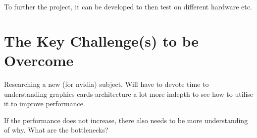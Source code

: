 To further the project, it can be developed to then test on different hardware etc.

\section{The Key Challenge(s) to be Overcome}
Researching a new (for nvidia) subject. Will have to devote time to understanding graphics cards architecture a lot more indepth to see how to utilise it to improve performance.

If the performance does not increase, there also needs to be more understanding of why. What are the bottlenecks? 


